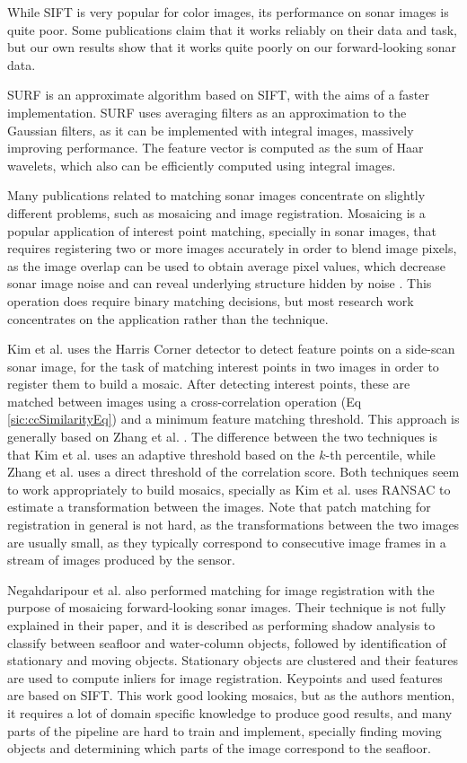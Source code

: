 While SIFT is very popular for color images, its performance on sonar images is quite poor. Some publications \cite[-2em]{vandrish2011side} claim that it works reliably on their data and task, but our own results show that it works quite poorly on our forward-looking sonar data.

SURF \cite[1em]{bay2006surf} is an approximate algorithm based on SIFT, with the aims of a faster implementation. SURF uses averaging filters as an approximation to the Gaussian filters, as it can be implemented with integral images, massively improving performance. The feature vector is computed as the sum of Haar wavelets, which also can be efficiently computed using integral images.

Many publications related to matching sonar images concentrate on slightly different problems, such as mosaicing and image registration. Mosaicing is a popular application of interest point matching, specially in sonar images, that requires registering two or more images accurately in order to blend image pixels, as the image overlap can be used to obtain average pixel values, which decrease sonar image noise and can reveal underlying structure hidden by noise \cite{hurtos2014real}. This operation does require binary matching decisions, but most research work concentrates on the application rather than the technique.

Kim et al. \cite[1em]{kim2005mosaicing} uses the Harris Corner detector to detect feature points on a side-scan sonar image, for the task of matching interest points in two images in order to register them to build a mosaic. After detecting interest points, these are matched between images using a cross-correlation operation (Eq \ref{sic:ccSimilarityEq}) and a minimum feature matching threshold. This approach is generally based on Zhang et al. \cite{zhang1995robust}. The difference between the two techniques is that Kim et al. uses an adaptive threshold based on the $k$-th percentile, while Zhang et al. uses a direct threshold of the correlation score. Both techniques seem to work appropriately to build mosaics, specially as Kim et al. uses RANSAC to estimate a transformation between the images. Note that patch matching for registration in general is not hard, as the transformations between the two images are usually small, as they typically correspond to consecutive image frames in a stream of images produced by the sensor.

Negahdaripour et al. \cite{negahdaripour2011dynamic} also performed matching for image registration with the purpose of mosaicing forward-looking sonar images. Their technique is not fully explained in their paper, and it is described as performing shadow analysis to classify between seafloor and water-column objects, followed by identification of stationary and moving objects. Stationary objects are clustered and their features are used to compute inliers for image registration. Keypoints and used features are based on SIFT. This work good looking mosaics, but as the authors mention, it requires a lot of domain specific knowledge to produce good results, and many parts of the pipeline are hard to train and implement, specially finding moving objects and determining which parts of the image correspond to the seafloor.

